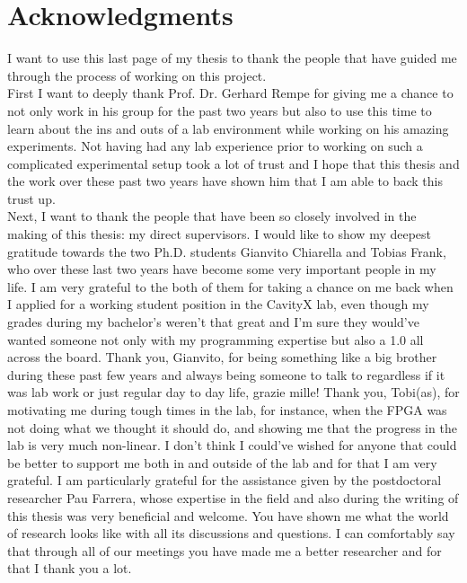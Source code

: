 \cleardoublepage
{}
\chapter*{\centering Acknowledgments}

I want to use this last page of my thesis to thank the people that have guided me through the process of working on this project. \\

First I want to deeply thank Prof. Dr. Gerhard Rempe for giving me a chance to not only work in his group for the past two years but also to use this time to learn about the ins and outs of a lab environment while working on his amazing experiments. Not having had any lab experience prior to working on such a complicated experimental setup took a lot of trust and I hope that this thesis and the work over these past two years have shown him that I am able to back this trust up. \\

Next, I want to thank the people that have been so closely involved in the making of this thesis: my direct supervisors. I would like to show my deepest gratitude towards the two Ph.D. students Gianvito Chiarella and Tobias Frank, who over these last two years have become some very important people in my life. I am very grateful to the both of them for taking a chance on me back when I applied for a working student position in the CavityX lab, even though my grades during my bachelor's weren't that great and I'm sure they would've wanted someone not only with my programming expertise but also a 1.0 all across the board. Thank you, Gianvito, for being something like a big brother during these past few years and always being someone to talk to regardless if it was lab work or just regular day to day life, grazie mille! Thank you, Tobi(as), for motivating me during tough times in the lab, for instance, when the FPGA was not doing what we thought it should do, and showing me that the progress in the lab is very much non-linear. I don't think I could've wished for anyone that could be better to support me both in and outside of the lab and for that I am very grateful.
I am particularly grateful for the assistance given by the postdoctoral researcher Pau Farrera, whose expertise in the field and also during the writing of this thesis was very beneficial and welcome. You have shown me what the world of research looks like with all its discussions and questions. I can comfortably say that through all of our meetings you have made me a better researcher and for that I thank you a lot. \\

